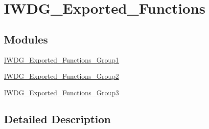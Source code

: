 \hypertarget{group___i_w_d_g___exported___functions}{\section{I\-W\-D\-G\-\_\-\-Exported\-\_\-\-Functions}
\label{group___i_w_d_g___exported___functions}
}
\subsection*{Modules}
\begin{DoxyCompactItemize}
\item 
\hyperlink{group___i_w_d_g___exported___functions___group1}{I\-W\-D\-G\-\_\-\-Exported\-\_\-\-Functions\-\_\-\-Group1}
\item 
\hyperlink{group___i_w_d_g___exported___functions___group2}{I\-W\-D\-G\-\_\-\-Exported\-\_\-\-Functions\-\_\-\-Group2}
\item 
\hyperlink{group___i_w_d_g___exported___functions___group3}{I\-W\-D\-G\-\_\-\-Exported\-\_\-\-Functions\-\_\-\-Group3}
\end{DoxyCompactItemize}


\subsection{Detailed Description}
